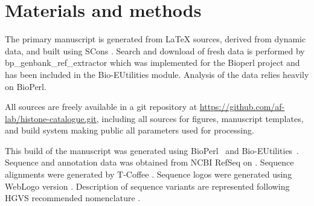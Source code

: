 \section{Materials and methods}

  The primary manuscript is generated from \LaTeX{} sources, derived
  from dynamic data, and built using SCons \citep{SCons2005}.
  Search and download of fresh data is performed by bp\_genbank\_ref\_extractor
  which was implemented for the Bioperl project \citep{bioperl} and has
  been included in the Bio-EUtilities module. Analysis of the data relies
  heavily on BioPerl.

  All sources are freely available in a git repository at
  \url{https://github.com/af-lab/histone-catalogue.git}, including all
  sources for figures, manuscript templates, and build system making public
  all parameters used for processing.

  This build of the manuscript was generated using BioPerl~\BioPerlVersion{}
  and Bio-EUtilities~\BioEUtilitiesVersion{}.
  Sequence and annotation data was obtained from NCBI RefSeq \citep{OLearyRefseq2016}
  on \printdate{\SequencesDate{}}.
  Sequence alignments were generated by T-Coffee \TCoffeVersion{} \citep{tcoffee2000}.
  Sequence logos were generated using WebLogo version \WebLogoVersion{} \citep{weblogo}.
  Description of sequence variants are represented following HGVS
  recommended nomenclature \citep{mutnomenclature2016}.
